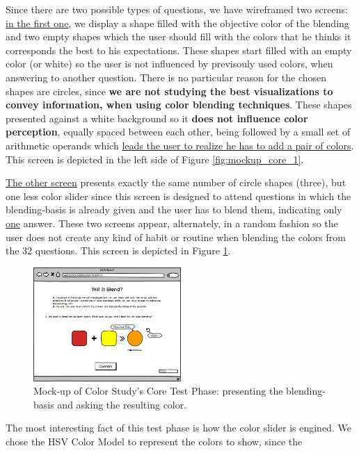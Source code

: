 %
Since there are two possible types of questions, we have wireframed two screens: \ul{in the first one}, we display a shape filled with the objective color of the
blending and two empty shapes which the user should fill with the colors that he thinks it corresponds the best to his expectations. These shapes start filled
with an empty color (or white) so the user is not influenced by previsouly used colors, when answering to another question. There is no particular reason for
the chosen shapes are circles, since \textbf{we are not studying the best visualizations to convey information, when using color blending techniques}. These
shapes presented against a white background so it \textbf{does not influence color perception}, equally spaced between each other, being followed by a small
set of arithmetic operands which \ul{leads the user to realize he has to add a pair of colors}. This screen is depicted in the left side of Figure
\ref{fig:mockup_core_1}. \par
%
\ul{The other screen} presents exactly the same number of circle shapes (three), but one less color slider since this screen is designed to attend questions in
which the blending-basis is already given and the user has to blend them, indicating only \ul{one} answer. These two screens appear, alternately, in a random
fashion so the user does not create any kind of habit or routine when blending the colors from the 32 questions. This screen is depicted in Figure
\ref{fig:mockup_core_2}. \par
%
\begin{figure}[htbp]
	\centering
  \includegraphics[width=0.5\textwidth]{images/implementation/mockup_core_twoColorsObj.png}
  \caption[Mock-up of Color Study's Core Test Phase: presenting the blending-basis and asking the resulting color.]{Mock-up of Color Study's Core
	Test Phase: presenting the blending-basis and asking the resulting color.}
  \label{fig:mockup_core_2}
\end{figure} \par
%
The most interesting fact of this test phase is how the color slider is engined. We chose the HSV Color Model to represent the colors to show, since the
